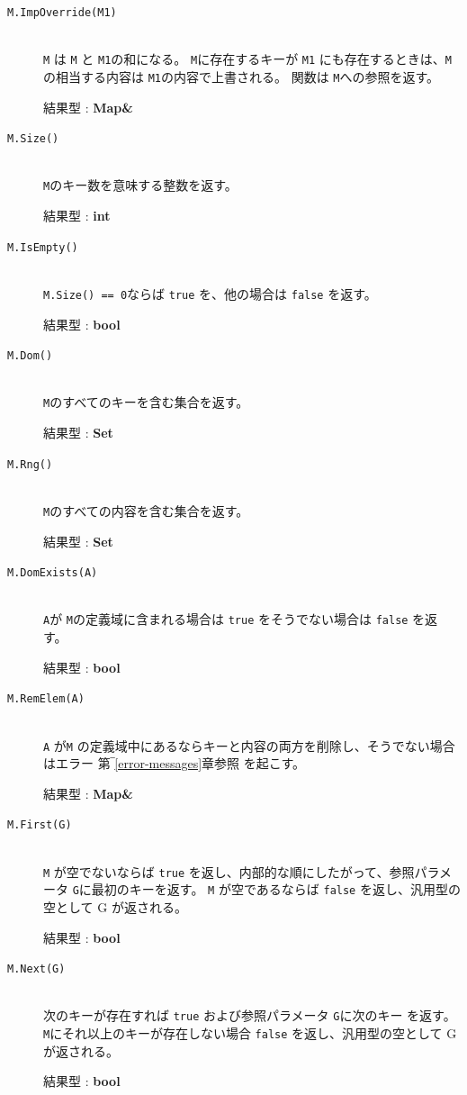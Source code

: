 \documentclass[\pformat,12pt]{jarticle}
\begin{document}
\begin{description}
\item[{\tt M.ImpOverride(M1)}] \mbox{}\\     
     {\tt M} は {\tt M} と {\tt M1}の和になる。 
{\tt M}に存在するキーが {\tt M1} にも存在するときは、{\tt M}の相当する内容は {\tt M1}の内容で上書される。 
     関数は {\tt M}への参照を返す。

     結果型 : {\bf Map\&}

\item[{\tt M.Size()}] \mbox{}\\
     {\tt M}のキー数を意味する整数を返す。

     結果型 : {\bf int}

\item[{\tt M.IsEmpty()}] \mbox{}\\
     {\tt M.Size() == 0}ならば {\tt true} を、他の場合は {\tt false} を返す。

     結果型 : {\bf bool}
     
\item[{\tt M.Dom()}] \mbox{}\\     
     {\tt M}のすべてのキーを含む集合を返す。   

     結果型 : {\bf Set}
    
\item[{\tt M.Rng()}] \mbox{}\\     
      {\tt M}のすべての内容を含む集合を返す。

     結果型 : {\bf Set}

\item[{\tt M.DomExists(A)}] \mbox{}\\     
     {\tt A}が {\tt M}の定義域に含まれる場合は {\tt true} をそうでない場合は {\tt false} を返す。

     結果型 : {\bf bool}

\item[{\tt M.RemElem(A)}] \mbox{}\\     
      {\tt A} が{\tt M} の定義域中にあるならキーと内容の両方を削除し、そうでない場合はエラー  第‾\ref{error-messages}章参照 を起こす。

     結果型 : {\bf Map\&}

\item[{\tt M.First(G)}] \mbox{}\\     
      {\tt M} が空でないならば {\tt true} を返し、内部的な順にしたがって、参照パラメータ {\tt G}に最初のキーを返す。
 {\tt M} が空であるならば {\tt false} を返し、汎用型の空として G が返される。

     結果型 : {\bf bool}
     
\item[{\tt M.Next(G)}] \mbox{}\\
     次のキーが存在すれば {\tt true} および参照パラメータ {\tt G}に次のキー を返す。 
 {\tt M}にそれ以上のキーが存在しない場合 {\tt false} を返し、汎用型の空として G が返される。

     結果型 : {\bf bool}
\end{description}
\end{document}
